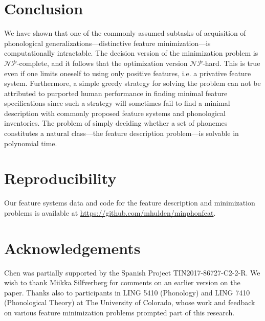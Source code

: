 \documentclass[11pt,a4paper]{article}
\begin{document}
\section{Conclusion}

We have shown that one of the commonly assumed subtasks of acquisition of phonological generalizations---distinctive feature minimization---is computationally intractable. The decision version of the minimization problem is $\mathcal{NP}$-complete, and it follows that the optimization version $\mathcal{NP}$-hard. This is true even if one limits oneself to using only positive features, i.e. a privative feature system.  Furthermore, a simple greedy strategy for solving the problem can not be attributed to purported human performance in finding minimal feature specifications since such a strategy will sometimes fail to find a minimal description with commonly proposed feature systems and phonological inventories. The problem of simply deciding whether a set of phonemes constitutes a natural class---the feature description problem---is solvable in polynomial time.

\section*{Reproducibility}

Our feature systems data and code for the feature description and minimization problems is available at \url{https://github.com/mhulden/minphonfeat}.

\section*{Acknowledgements}

Chen was partially supported by the Spanish Project TIN2017-86727-C2-2-R. We wish to thank Miikka Silfverberg for comments on an earlier version on the paper. Thanks also to participants in LING 5410 (Phonology) and LING 7410 (Phonological Theory) at The University of Colorado, whose work and feedback on various feature minimization problems prompted part of this research.

\nocite{kornai1993}



\end{document}
